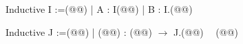 Inductive I :=(@\vspace{-0.04cm}@)
| A : I(@\vspace{-0.04cm}@)
| B : I.(@\vspace{-0.04cm}@)

Inductive J :=(@\vspace{-0.04cm}@)
| (@@) : (@@) $\rightarrow$ J.(@\vspace{-0.04cm}@)
$\phantom{hi}$(@\vspace{-0.04cm}@)

